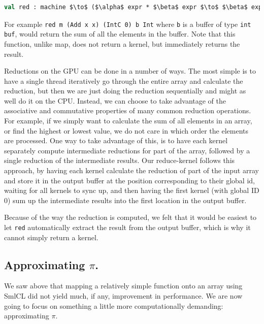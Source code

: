 \begin{lstlisting}[language=ML,mathescape,caption=Signature for \texttt{red}.]
  val red : machine $\to$ ($\alpha$ expr * $\beta$ expr $\to$ $\beta$ expr) $\to$ $\beta$ expr $\to$ $\alpha$ T $\to$ $\beta$ T $\to$ ($\alpha$, $\beta$)kern1
\end{lstlisting}


For example \texttt{red m (Add x x) (IntC 0) b Int} where \texttt{b}
is a buffer of type \texttt{int buf}, would return the sum of all the
elements in the buffer. Note that this function, unlike map, does not
return a kernel, but immediately returns the result.

Reductions on the GPU can be done in a number of ways. The most simple
is to have a single thread iteratively go through the entire array and
calculate the reduction, but then we are just doing the reduction
sequentially and might as well do it on the CPU. Instead, we can
choose to take advantage of the associative and commutative properties
of many common reduction operations. For example, if we simply want to
calculate the sum of all elements in an array, or find the highest or
lowest value, we do not care in which order the elements are
processed. One way to take advantage of this, is to have each kernel
separately compute intermediate reductions for part of the array,
followed by a single reduction of the intermediate results. Our
reduce-kernel follows this approach, by having each kernel calculate
the reduction of part of the input array and store it in the output
buffer at the position corresponding to their global id, waiting for
all kernels to sync up, and then having the first kernel (with global
ID 0) sum up the intermediate results into the first location in the
output buffer. 

Because of the way the reduction is computed, we felt that it would be
easiest to let \texttt{red} automatically extract the result from the
output buffer, which is why it cannot simply return a kernel.

\subsection{Approximating $\pi$.}
\label{sec:pi}

We saw above that mapping a relatively simple function onto an array
using SmlCL did not yield much, if any, improvement in performance. We
are now going to focus on something a little more computationally
demanding: approximating $\pi$.

